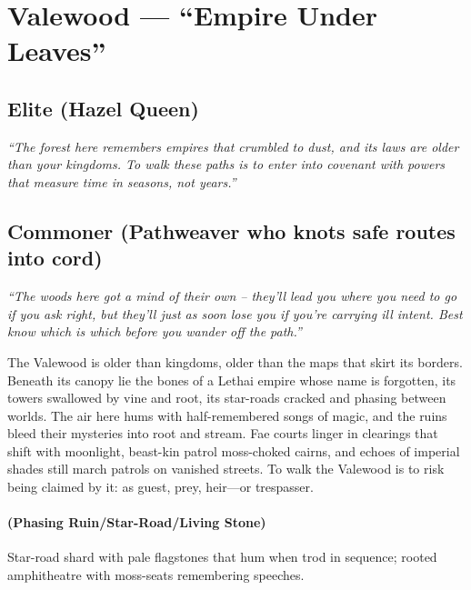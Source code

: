 \section{Valewood --- ``Empire Under Leaves''}
\label{chap:valewood}

\subsection*{Elite (Hazel Queen)}
\textit{``The forest here remembers empires that crumbled to dust, and its laws are older than your kingdoms. To walk these paths is to enter into covenant with powers that measure time in seasons, not years.''}

\subsection*{Commoner (Pathweaver who knots safe routes into cord)}
\textit{``The woods here got a mind of their own – they'll lead you where you need to go if you ask right, but they'll just as soon lose you if you're carrying ill intent. Best know which is which before you wander off the path.''}


\begin{tcolorbox}[colback=black!3,colframe=black!40!white,title={Theme \& Atmosphere}]
The Valewood is older than kingdoms, older than the maps that skirt its borders. Beneath its canopy lie the bones of a Lethai empire whose name is forgotten, its towers swallowed by vine and root, its star-roads cracked and phasing between worlds. The air here hums with half-remembered songs of magic, and the ruins bleed their mysteries into root and stream. Fae courts linger in clearings that shift with moonlight, beast-kin patrol moss-choked cairns, and echoes of imperial shades still march patrols on vanished streets. To walk the Valewood is to risk being claimed by it: as guest, prey, heir—or trespasser.
\end{tcolorbox}

\paragraph*{(Phasing Ruin/Star-Road/Living Stone)} Star-road shard with pale flagstones that hum when trod in sequence; rooted amphitheatre with moss-seats remembering speeches.

